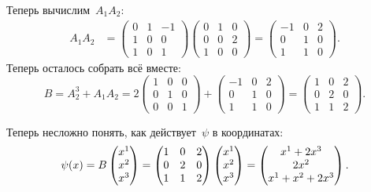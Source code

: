 \begin{solution}
	Теперь вычислим~$A_1 A_2$:
	\begin{align*}
		A_1 A_2 &=
		\left( 
			\begin{array}{rrr}
				0 & 1 & -1
				\\
				\hline
				1 & 0 & 0
				\\
				\hline
				1 & 0 & 1
			\end{array}
		\right)
		\left( 
			\begin{array}{c|c|c}
				0 & 1 & 0
				\\
				0 & 0 & 2
				\\
				1 & 0 & 0
			\end{array}
		\right)
		=
		\left( 
			\begin{array}{rrr}
				-1 & 0 & 2
				\\
				0 & 1 & 0
				\\
				1 & 1 & 0
			\end{array}
		\right)
		.
	\end{align*}
	Теперь осталось собрать всё вместе:
	\[
		B = A_2^3 + A_1 A_2 =
		2
		\begin{pmatrix}
			1 & 0 & 0
			\\
			0 & 1 & 0
			\\
			0 & 0 & 1
		\end{pmatrix}
		+
		\begin{pmatrix}
			-1 & 0 & 2
			\\
			0 & 1 & 0
			\\
			1 & 1 & 0
		\end{pmatrix}
		=
		\begin{pmatrix}
			1 & 0 & 2
			\\
			0 & 2 & 0
			\\
			1 & 1 & 2
		\end{pmatrix}
		.
	\]

	Теперь несложно понять, как действует~$\psi$ в координатах:
	\[
		\psi(x)
		=
		B
		\begin{pmatrix}x^1 \\ x^2 \\ x^3\end{pmatrix}
		=
		\begin{pmatrix}
			1 & 0 & 2
			\\
			0 & 2 & 0
			\\
			1 & 1 & 2
		\end{pmatrix}
		\begin{pmatrix}x^1 \\ x^2 \\ x^3\end{pmatrix}
		=
		\begin{pmatrix}
			x^1 + 2x^3
			\\
			2x^2
			\\
			x^1 + x^2 + 2x^3
		\end{pmatrix}
		.
	\]
\end{solution}


